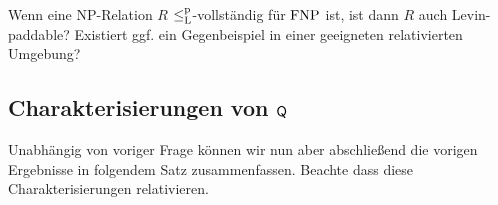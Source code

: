 %
%
\begin{question}\label{question:levin-paddable}
    Wenn eine NP-Relation $R$ $\leq_\mathrm{L}^\mathrm{p}$-vollständig für $\mathrm{FNP}$ ist, ist dann $R$ auch Levin-paddable?
    Existiert ggf. ein Gegenbeispiel in einer geeigneten relativierten Umgebung?
\end{question}

\subsection*{Charakterisierungen von $\mathsf{Q}$}

Unabhängig von voriger Frage können wir nun aber abschließend die vorigen Ergebnisse in folgendem Satz zusammenfassen.
Beachte dass diese Charakterisierungen relativieren.

